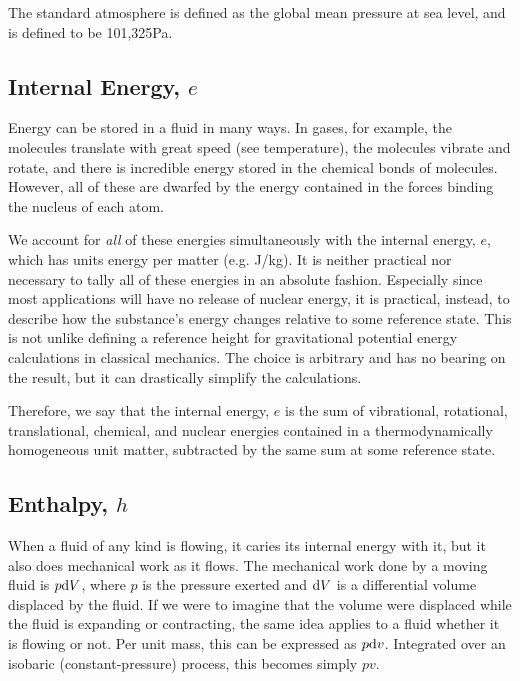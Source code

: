 The standard atmosphere is defined as the global mean pressure at sea level, and is defined to be 101,325Pa.  

\subsection{Internal Energy, $e$}\label{sec:intro:e}

Energy can be stored in a fluid in many ways.  In gases, for example, the molecules translate with great speed (see temperature), the molecules vibrate and rotate, and there is incredible energy stored in the chemical bonds of molecules.  However, all of these are dwarfed by the energy contained in the forces binding the nucleus of each atom.

We account for \emph{all} of these energies simultaneously with the internal energy, $e$, which has units energy per matter (e.g. J/kg).  It is neither practical nor necessary to tally all of these energies in an absolute fashion.  Especially since most applications will have no release of nuclear energy, it is practical, instead, to describe how the substance's energy changes relative to some reference state.  This is not unlike defining a reference height for gravitational potential energy calculations in classical mechanics.  The choice is arbitrary and has no bearing on the result, but it can drastically simplify the calculations.

Therefore, we say that the internal energy, $e$ is the sum of vibrational, rotational, translational, chemical, and nuclear energies contained in a thermodynamically homogeneous unit matter, subtracted by the same sum at some reference state.

\subsection{Enthalpy, $h$}\label{sec:intro:h}

When a fluid of any kind is flowing, it caries its internal energy with it, but it also does mechanical work as it flows.  The mechanical work done by a moving fluid is $p \mathrm{d} V$, where $p$ is the pressure exerted and $\mathrm{d} V$ is a differential volume displaced by the fluid.  If we were to imagine that the volume were displaced while the fluid is expanding or contracting, the same idea applies to a fluid whether it is flowing or not.  Per unit mass, this can be expressed as $p \mathrm{d} v$.  Integrated over an isobaric (constant-pressure) process, this becomes simply $p v$.

